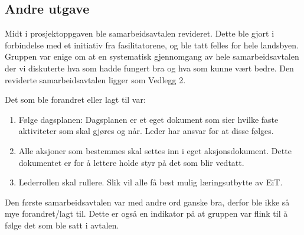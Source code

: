 \subsection{Andre utgave}
Midt i prosjektoppgaven ble samarbeidsavtalen revideret. 
Dette ble gjort i forbindelse med et initiativ fra fasilitatorene, og ble tatt felles for hele landsbyen. 
Gruppen var enige om at en systematisk gjennomgang av hele samarbeidsavtalen der vi diskuterte hva som hadde fungert bra og hva som kunne vært bedre. 
Den reviderte samarbeidsavtalen ligger som Vedlegg 2. 
\vspace{\secspace}

\noindent Det som ble forandret eller lagt til var: 
\begin{enumerate}
  \item Følge dagsplanen: Dagsplanen er et eget dokument som sier hvilke faste aktiviteter som skal gjøres og når. Leder har ansvar for at disse følges. 
  \item Alle aksjoner som bestemmes skal settes inn i eget aksjonsdokument. Dette dokumentet er for å lettere holde styr på det som blir vedtatt.
  \item Lederrollen skal rullere. Slik vil alle få best mulig læringsutbytte av EiT. 
\end{enumerate}

Den første samarbeidsavtalen var med andre ord ganske bra, derfor ble ikke så mye forandret/lagt til. 
Dette er også en indikator på at gruppen var flink til å følge det som ble satt i avtalen. 
